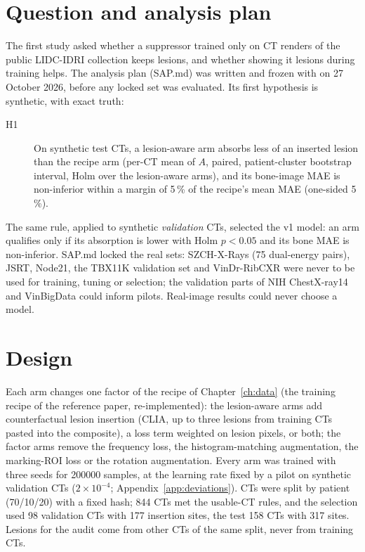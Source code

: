 \section{Question and analysis plan}
The first study asked whether a suppressor trained only on CT renders of the public LIDC-IDRI collection keeps lesions, and whether showing
it lesions during training helps. The analysis plan (SAP.md) was written and frozen with  on 27 October 2026, before any
locked set was evaluated. Its first hypothesis is synthetic, with exact truth:
\begin{description}
\item[H1] On synthetic test CTs, a lesion-aware arm absorbs less of an inserted lesion than the recipe arm (per-CT mean of $A$, paired,
 patient-cluster bootstrap interval, Holm over the lesion-aware arms), and its bone-image MAE is non-inferior within a margin of 5\,\% of the
 recipe's mean MAE (one-sided 5\,\%).
\end{description}
The same rule, applied to synthetic \emph{validation} CTs, selected the v1 model: an arm qualifies only if its absorption is lower with Holm
$p<0.05$ and its bone MAE is non-inferior. SAP.md locked the real sets: SZCH-X-Rays (75 dual-energy pairs), JSRT, Node21, the TBX11K
validation set and VinDr-RibCXR were never to be used for training, tuning or selection; the validation parts of NIH ChestX-ray14 and
VinBigData could inform pilots. Real-image results could never choose a model.

\section{Design}
Each arm changes one factor of the recipe of Chapter~\ref{ch:data} (the training recipe of the reference paper, re-implemented): the
lesion-aware arms add counterfactual lesion insertion (CLIA, up to three lesions from training CTs pasted into the composite), a loss term
weighted on lesion pixels, or both; the factor arms remove the frequency loss, the histogram-matching augmentation, the marking-ROI loss or
the rotation augmentation. Every arm was trained with three seeds for \num{200000} samples, at the learning rate fixed by a pilot on
synthetic validation CTs ($2\times10^{-4}$; Appendix~\ref{app:deviations}). CTs were split by patient (70/10/20) with a fixed hash; 844 CTs met
the usable-CT rules, and the selection used 98 validation CTs with 177 insertion sites, the test 158 CTs with 317 sites. Lesions for the audit
come from other CTs of the same split, never from training CTs.

